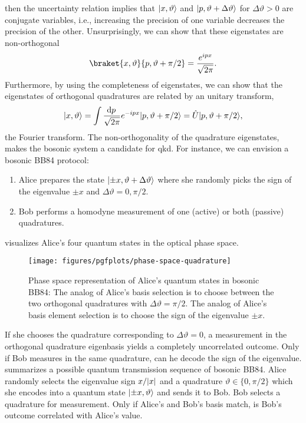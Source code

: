 then the uncertainty relation implies that $\lvert x,\vartheta\rangle$ and $\lvert p,\vartheta+\Delta\vartheta\rangle$ for $\Delta\vartheta>0$ are conjugate variables, i.e., increasing the precision of one variable decreases the precision of the other.
Unsurprisingly, we can show that these eigenstates are non-orthogonal~\cite[p.~29]{Mukhanov2007}
\begin{equation}
	\braket{x,\vartheta}{p,\vartheta+\pi/2}
	=
	\frac{e^{ipx}}{\sqrt{2\pi}}
	\label{eq:position_momentum_product}
	.
\end{equation}
Furthermore, by using the completeness of eigenstates, we can show that the eigenstates of orthogonal quadratures are related by an unitary transform,
\begin{equation}
	\ket{x,\vartheta}
	=
	\int\frac{\dd{p}}{\sqrt{2\pi}}
	e^{-ipx}
	\ket{p,\vartheta+\pi/2}
	=
	\hat{U}
	\ket{p,\vartheta+\pi/2}
	,
\end{equation}
the Fourier transform.
The non-orthogonality of the quadrature eigenstates, makes the bosonic system a candidate for \gls{qkd}.
For instance, we can envision a bosonic BB84 protocol:
\begin{enumerate}
	\item Alice prepares the state $\lvert\pm x,\vartheta+\Delta\vartheta\rangle$ where she randomly picks the sign of the eigenvalue $\pm x$ and $\Delta\vartheta=0,\pi/2$.
	\item Bob performs a homodyne measurement of one (active) or both (passive) quadratures.
\end{enumerate}
 visualizes Alice's four quantum states in the optical phase space.
\begin{figure}[htb]
	\centering
	\texttt{[image: figures/pgfplots/phase-space-quadrature]}
	\caption{Phase space representation of Alice's quantum states in bosonic BB84: The analog of Alice's basis selection is to choose between the two orthogonal quadratures with $\Delta\vartheta=\pi/2$. The analog of Alice's basis element selection is to choose the sign of the eigenvalue $\pm x$.}\label{fig:phase_space_quadrature}
\end{figure}
If she chooses the quadrature corresponding to $\Delta\vartheta=0$, a measurement in the orthogonal quadrature eigenbasis yields a completely uncorrelated outcome.
Only if Bob measures in the same quadrature, can he decode the sign of the eigenvalue.
 summarizes a possible quantum transmission sequence of bosonic BB84.
Alice randomly selects the eigenvalue sign $x/\lvert x\rvert$ and a quadrature $\vartheta\in\{0,\pi/2\}$ which she encodes into a quantum state $\lvert\pm x,\vartheta\rangle$ and sends it to Bob. Bob selects a quadrature for measurement. Only if Alice's and Bob's basis match, is Bob's outcome correlated with Alice's value.
